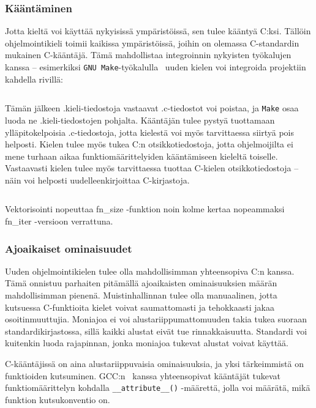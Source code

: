 \subsubsection{Kääntäminen}

Jotta kieltä voi käyttää nykyisissä ympäristöissä, sen tulee kääntyä C:ksi.
Tällöin ohjelmointikieli toimii kaikissa ympäristöissä, joihin on olemassa
C-standardin mukainen C-kääntäjä. Tämä mahdollistaa integroinnin nykyisten
työkalujen kanssa -- esimerkiksi \texttt{GNU Make}-työkalulla~\citep{gnumake}
uuden kielen voi integroida projektiin kahdella rivillä:

\inputminted{make}{Makefile.kieli}

Tämän jälkeen .kieli-tiedostoja vastaavat .c-tiedostot voi poistaa, ja
\texttt{Make} osaa luoda ne .kieli-tiedostojen pohjalta. Kääntäjän tulee pystyä
tuottamaan ylläpitokelpoisia .c-tiedostoja, jotta kielestä voi myös
tarvittaessa siirtyä pois helposti.  Kielen tulee myös tukea C:n
otsikkotiedostoja, jotta ohjelmoijilta ei mene turhaan aikaa
funktiomäärittelyiden kääntämiseen kieleltä toiselle. Vastaavasti kielen tulee
myös tarvittaessa tuottaa C-kielen otsikkotiedostoja -- näin voi helposti
uudelleenkirjoittaa C-kirjastoja.

\begin{listing}[ht!]
    \inputminted[firstline=4]{C}{vectorization.c}

    \caption{Vektorisointi nopeuttaa fn\_size -funktion noin kolme kertaa
    nopeammaksi fn\_iter -versioon verrattuna.}
\end{listing}

\subsubsection{Ajoaikaiset ominaisuudet}

Uuden ohjelmointikielen tulee olla mahdollisimman yhteensopiva C:n kanssa. Tämä
onnistuu parhaiten pitämällä ajoaikaisten ominaisuuksien määrän mahdollisimman
pienenä. Muistinhallinnan tulee olla manuaalinen, jotta kutsuessa C-funktioita
kielet voivat saumattomasti ja tehokkaasti jakaa osoitinmuuttujia. Moniajoa ei
voi alustariippumattomuuden takia tukea suoraan standardikirjastossa, sillä
kaikki alustat eivät tue rinnakkaisuutta. Standardi voi kuitenkin luoda
rajapinnan, jonka moniajoa tukevat alustat voivat käyttää.

C-kääntäjissä on aina alustariippuvaisia ominaisuuksia, ja yksi tärkeimmistä on
funktioiden kutsuminen. GCC:n~\citep{gcc} kanssa yhteensopivat kääntäjät
tukevat funktiomäärittelyn kohdalla \texttt{\_\_attribute\_\_()} -määrettä,
jolla voi määrätä, mikä funktion kutsukonventio on.

